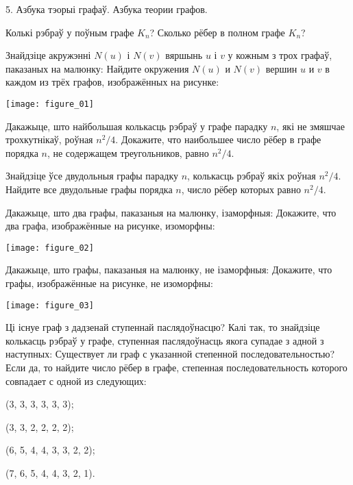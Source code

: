 \documentclass[12pt, a4paper]{article}
\begin{document}
\biLangHeader
{5. Азбука тэорыі графаў.}
{Азбука теории графов.}

\begin{problemList}

\problemItemSimple
{Колькі рэбраў у поўным графе $K_n$?}
{Сколько рёбер в полном графе $K_n$?}

\bigskip

\problemItemWithCommonPart
{Знайдзіце акружэнні $N(u)$ і $N(v)$ вяршынь $u$ і $v$ у кожным з трох графаў, паказаных на малюнку:}
{Найдите окружения $N(u)$ и $N(v)$ вершин $u$ и $v$ в каждом из трёх графов, изображённых на рисунке:}
{%
\begin{center}
    \texttt{[image: figure\_01]}
\end{center}
}

\problemItemSimple
{Дакажыце, што найбольшая колькасць рэбраў у графе парадку $n$, які не змяшчае трохкутнікаў, роўная $n^2/4$.}
{Докажите, что наибольшее число рёбер в графе порядка $n$, не содержащем треугольников, равно $n^2/4$.}

\bigskip

\problemItemSimple
{Знайдзіце ўсе двудольныя графы парадку $n$, колькасць рэбраў якіх роўная $n^2/4$.}
{Найдите все двудольные графы порядка $n$, число рёбер которых равно $n^2/4$.}

\bigskip

\problemItemWithCommonPart
{Дакажыце, што два графы, паказаныя на малюнку, ізаморфныя:}
{Докажите, что два графа, изображённые на рисунке, изоморфны:}
{%
\begin{center}
    \texttt{[image: figure\_02]}
\end{center}
}

\problemItemWithCommonPart
{Дакажыце, што графы, паказаныя на малюнку, не ізаморфныя:}
{Докажите, что графы, изображённые на рисунке, не изоморфны:}
{%
\begin{center}
    \texttt{[image: figure\_03]}
\end{center}
}

\problemItemWithCommonPart
{Ці існуе граф з дадзенай ступеннай паслядоўнасцю?
Калі так, то знайдзіце колькасць рэбраў у графе,
ступенная паслядоўнасць якога супадае з адной з наступных:}
{Существует ли граф с указанной степенной последовательностью?
Если да, то найдите число рёбер в графе,
степенная последовательность которого совпадает с одной из следующих:}
{%
\begin{belarusianEnumerateTwocol}
    \item (3, 3, 3, 3, 3, 3);
    \item (3, 3, 2, 2, 2, 2);
    \item (6, 5, 4, 4, 3, 3, 2, 2);
    \item (7, 6, 5, 4, 4, 3, 2, 1).
\end{belarusianEnumerateTwocol}
}


\end{problemList}
\end{document}
